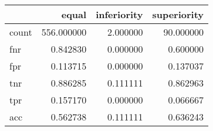\begin{tabular}{lrrr}
\toprule
{} &       equal &  inferiority &  superiority \\
\midrule
count &  556.000000 &     2.000000 &    90.000000 \\
fnr   &    0.842830 &     0.000000 &     0.600000 \\
fpr   &    0.113715 &     0.000000 &     0.137037 \\
tnr   &    0.886285 &     0.111111 &     0.862963 \\
tpr   &    0.157170 &     0.000000 &     0.066667 \\
acc   &    0.562738 &     0.111111 &     0.636243 \\
\bottomrule
\end{tabular}
